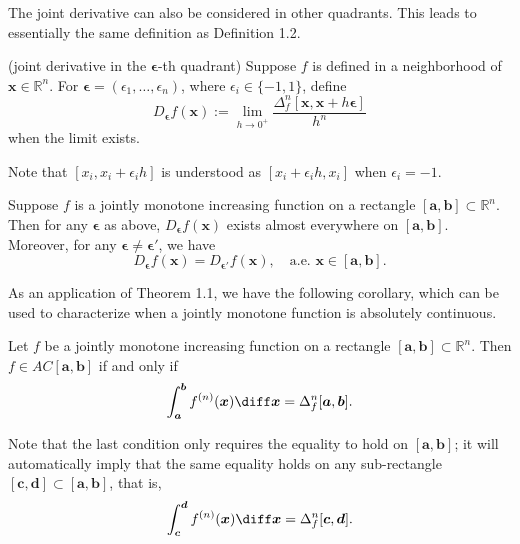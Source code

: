 \documentclass{ijclclp}
\begin{document}
The joint derivative can also be considered in other quadrants. This leads to essentially the same definition as Definition 1.2. 

\begin{definition}{(joint derivative in the \(\boldsymbol{\epsilon}\)-th quadrant)}
    Suppose \(f\) is defined in a neighborhood of \(\boldsymbol{x}\in\mathbb R^n\). For \(\boldsymbol{\epsilon}=(\epsilon_1,\dots,\epsilon_n)\), where \(\epsilon_i\in\{-1, 1\}\), define 
    \[D_{\boldsymbol{\epsilon}}f(\boldsymbol{x}):=\lim_{h\to 0^+} \frac{\Delta_f^n[\boldsymbol{x}, \boldsymbol{x}+h\boldsymbol{\epsilon}]}{h^n}\]
    when the limit exists. \\[-0.5em]
\end{definition}

Note that \([x_i,x_i+\epsilon_i h]\) is understood as \([x_i+\epsilon_i h,x_i]\) when \(\epsilon_i=-1\).
    
\begin{proposition}
    Suppose \(f\) is a jointly monotone increasing function on a rectangle \([\boldsymbol{a},\boldsymbol{b}]\subset\mathbb R^n\). Then for any \(\boldsymbol{\epsilon}\) as above, \(D_{\boldsymbol{\epsilon}}f(\boldsymbol{x})\) exists almost everywhere on \([\boldsymbol{a},\boldsymbol{b}]\). Moreover, for any \(\boldsymbol{\epsilon}\neq\boldsymbol{\epsilon}'\), we have
    \begin{equation}
        D_{\boldsymbol{\epsilon}}f(\boldsymbol{x})=D_{\boldsymbol{\epsilon'}}f(\boldsymbol{x}),\quad \text{a.e. }\boldsymbol{x}\in[\boldsymbol{a},\boldsymbol{b}].
    \end{equation}
\end{proposition}

As an application of Theorem 1.1, we have the following corollary, which can be used to characterize when a jointly monotone function is absolutely continuous. 

\begin{corollary}
    Let \(f\) be a jointly monotone increasing function on a rectangle \([\boldsymbol{a},\boldsymbol{b}]\subset\mathbb R^n\). Then \(f\in AC[\boldsymbol{a},\boldsymbol{b}]\) if and only if
    \[\int_{\boldsymbol{a}}^{\boldsymbol{b}}f^{(n)}(\boldsymbol{x})\diff\boldsymbol{x}=\Delta_f^n[\boldsymbol{a},\boldsymbol{b}].\]
\end{corollary}

Note that the last condition only requires the equality to hold on \([\boldsymbol{a},\boldsymbol{b}]\); it will automatically imply that the same equality holds on any sub-rectangle \([\boldsymbol{c},\boldsymbol{d}]\subset[\boldsymbol{a},\boldsymbol{b}]\), that is, 
    \[\int_{\boldsymbol{c}}^{\boldsymbol{d}}f^{(n)}(\boldsymbol{x})\diff\boldsymbol{x}=\Delta_f^n[\boldsymbol{c},\boldsymbol{d}].\]
\end{document}
